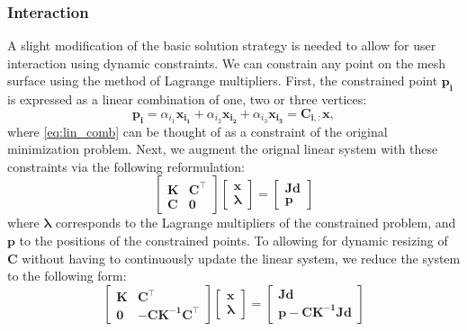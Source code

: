 \subsubsection{Interaction}
A slight modification of the basic solution strategy is needed to 
allow for user interaction using dynamic constraints.
We can constrain any point on the mesh surface using the method of
Lagrange multipliers. First, the constrained point $\mathbf{p_i}$ is expressed as a linear 
combination of one, two or three vertices:
\begin{equation}
\label{eq:lin_comb}
\mathbf{p_i} =
\alpha_{i_1} \mathbf{x_{i_1}} +
\alpha_{i_2} \mathbf{x_{i_2}} +
\alpha_{i_3} \mathbf{x_{i_3}} =
\mathbf{C_{i,:} x},
\end{equation}
where \autoref{eq:lin_comb} can be thought of as a constraint of the original minimization 
problem. Next, we augment the orignal linear system with these constraints via the 
following reformulation:
\begin{equation}
    \begin{bmatrix}
        \mathbf{K} & \mathbf{C}^\intercal \\
        \mathbf{C} & \mathbf{0}
    \end{bmatrix}
    \begin{bmatrix}
        \mathbf{x} \\
        \boldsymbol{\lambda}
    \end{bmatrix}
    =
    \begin{bmatrix}
        \mathbf{Jd} \\
        \mathbf{p}
    \end{bmatrix}
\end{equation}
where $\boldsymbol{\lambda}$ corresponds to the Lagrange multipliers of the 
constrained problem, and $\mathbf{p}$ to the positions of the constrained points.
To allowing for dynamic resizing of $\mathbf{C}$ without having to continuously
update the linear system, we reduce the system to the following form:
\begin{equation}
    \begin{bmatrix}
        \mathbf{K} & \mathbf{C}^\intercal \\
        \mathbf{0} & -\mathbf{CK^{-1}C^\intercal}
    \end{bmatrix}
    \begin{bmatrix}
        \mathbf{x} \\
        \boldsymbol{\lambda}
    \end{bmatrix}
    =
    \begin{bmatrix}
        \mathbf{Jd} \\
        \mathbf{p} - \mathbf{CK^{-1}Jd}
    \end{bmatrix}
\end{equation}

